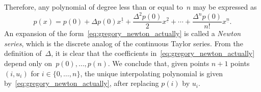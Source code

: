Therefore, any polynomial of degree less than or equal to~$n$ may be expressed as
\begin{equation}
    \label{eq:gregory_newton_actually}
    p(x) = p(0) + \Delta p(0) x^{\underline{1}} + \frac{\Delta^2 p(0)}{2} x^{\underline{2}} + \dotsb + \frac{\Delta^n p(0)}{n!} x^{\underline{n}}.
\end{equation}
An expansion of the form~\eqref{eq:gregory_newton_actually} is called a \emph{Newton series},
which is the discrete analog of the continuous Taylor series.
From the definition of~$\Delta$,
it is clear that the coefficients in~\eqref{eq:gregory_newton_actually} depend only on~$p(0), \dotsc, p(n)$.
We conclude that, given points $n+1$ points $(i, u_i)$ for $i \in \{0, \dotsc, n\}$,
the unique interpolating polynomial is given by~\eqref{eq:gregory_newton_actually},
after replacing $p(i)$ by $u_i$.

